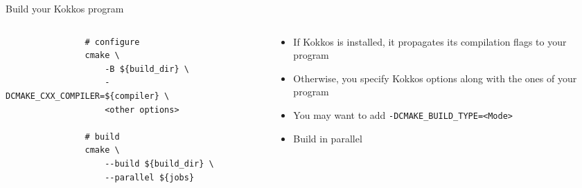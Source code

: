 \documentclass[
    aspectratio=169,
    handout,
]{beamer}
\begin{document}
\begin{frame}[fragile]{Build your Kokkos program}
    \begin{columns}
        \begin{column}{0.6\linewidth}
            \begin{verbatim}
                # configure
                cmake \
                    -B ${build_dir} \
                    -DCMAKE_CXX_COMPILER=${compiler} \
                    <other options>

                # build
                cmake \
                    --build ${build_dir} \
                    --parallel ${jobs}
            \end{verbatim}
        \end{column}
        \begin{column}{0.4\linewidth}
            \begin{itemize}
                \item If Kokkos is installed, it propagates its compilation flags to your program
                \item Otherwise, you specify Kokkos options along with the ones of your program
                \item You may want to add \texttt{-DCMAKE\_BUILD\_TYPE=<Mode>}
                \item Build in parallel
            \end{itemize}
        \end{column}
    \end{columns}
\end{frame}

\end{document}
